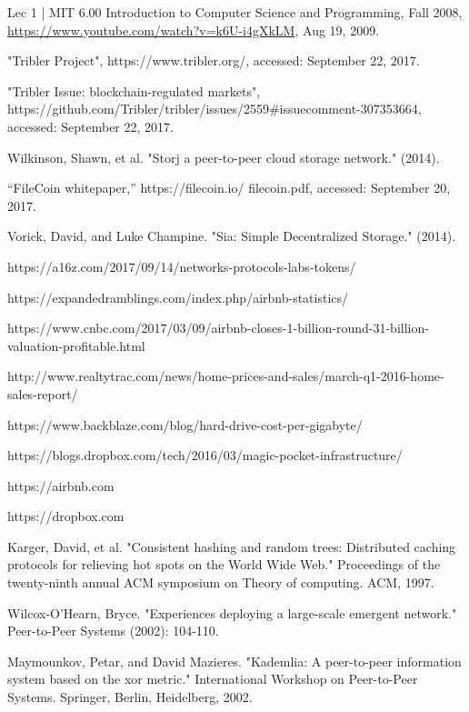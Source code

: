 \documentclass[journal]{IEEEtran}
\begin{document}
\begin{thebibliography}{1}

Lec 1 | MIT 6.00 Introduction to Computer Science and Programming, Fall 2008, \url{https://www.youtube.com/watch?v=k6U-i4gXkLM}, Aug 19, 2009.


 "Tribler Project", https://www.tribler.org/, accessed: September 22, 2017.

"Tribler Issue: blockchain-regulated markets", https://github.com/Tribler/tribler/issues/2559#issuecomment-307353664, accessed: September 22, 2017.

 Wilkinson, Shawn, et al. "Storj a peer-to-peer cloud storage network." (2014).

 “FileCoin
whitepaper,” https://filecoin.io/ filecoin.pdf, accessed: September 20, 2017.

 Vorick, David, and Luke Champine. "Sia: Simple Decentralized Storage." (2014).

 https://a16z.com/2017/09/14/networks-protocols-labs-tokens/

 https://expandedramblings.com/index.php/airbnb-statistics/

 https://www.cnbc.com/2017/03/09/airbnb-closes-1-billion-round-31-billion-valuation-profitable.html

 http://www.realtytrac.com/news/home-prices-and-sales/march-q1-2016-home-sales-report/

 https://www.backblaze.com/blog/hard-drive-cost-per-gigabyte/

 https://blogs.dropbox.com/tech/2016/03/magic-pocket-infrastructure/

 https://airbnb.com

 https://dropbox.com

 Karger, David, et al. "Consistent hashing and random trees: Distributed caching protocols for relieving hot spots on the World Wide Web." Proceedings of the twenty-ninth annual ACM symposium on Theory of computing. ACM, 1997.

 Wilcox-O’Hearn, Bryce. "Experiences deploying a large-scale emergent network." Peer-to-Peer Systems (2002): 104-110.

 Maymounkov, Petar, and David Mazieres. "Kademlia: A peer-to-peer information system based on the xor metric." International Workshop on Peer-to-Peer Systems. Springer, Berlin, Heidelberg, 2002.

\end{thebibliography}
\end{document}
